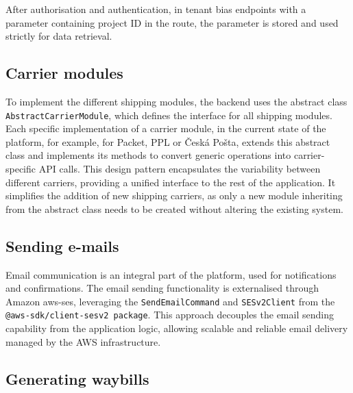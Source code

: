 After authorisation and authentication, in tenant bias endpoints with a parameter containing project ID in the route, the parameter is stored and used strictly for data retrieval.

\subsection{Carrier modules}
To implement the different shipping modules, the backend uses the abstract class \texttt{AbstractCarrierModule}, which defines the interface for all shipping modules.
Each specific implementation of a carrier module, in the current state of the platform, for example, for Packet, PPL or Česká Pošta, extends this abstract class and implements its methods to convert generic operations into carrier-specific API calls. 
This design pattern encapsulates the variability between different carriers, providing a unified interface to the rest of the application. 
It simplifies the addition of new shipping carriers, as only a new module inheriting from the abstract class needs to be created without altering the existing system.

\subsection{Sending e-mails}
Email communication is an integral part of the platform, used for notifications and confirmations. 
The email sending functionality is externalised through Amazon \gls{aws-ses}, leveraging the \texttt{SendEmailCommand} and \texttt{SESv2\-Client} from the \texttt{@aws-sdk/client-sesv2 package}. This approach decouples the email sending capability from the application logic, allowing scalable and reliable email delivery managed by the AWS infrastructure.

\subsection{Generating waybills}


